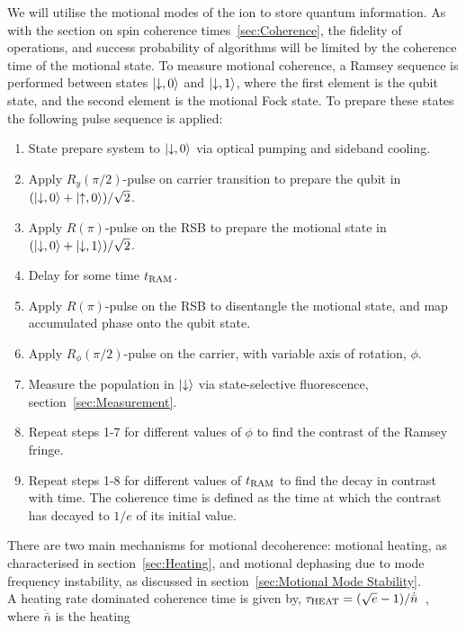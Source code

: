     We will utilise the motional modes of the ion to store quantum information.
    As with the section on spin coherence times~\ref{sec:Coherence}, the
    fidelity of operations, and success probability of algorithms will be
    limited by the coherence time of the motional state.  To measure motional
    coherence, a Ramsey sequence is performed between states $\ket{\downarrow, 0}$
    and $\ket{\downarrow, 1}$, where the first element is the qubit
    state, and the second element is the motional Fock state. To prepare these
    states the following pulse sequence is applied:
    \begin{enumerate}
    \item State prepare system to $\ket{\downarrow, 0}$ via optical pumping and sideband cooling.
    \item Apply $R_y(\pi/2)$-pulse on carrier transition to prepare the qubit in $(\ket{\downarrow, 0} + \ket{\uparrow, 0})/\sqrt{2}$.
    \item Apply $R(\pi)$-pulse on the RSB to prepare the motional state in $(\ket{\downarrow, 0} + \ket{\downarrow, 1})/\sqrt{2}$.
    \item Delay for some time $t_{\rm RAM}$.
    \item Apply $R(\pi)$-pulse on the RSB to disentangle the motional state, and map accumulated phase onto the qubit state.
    \item Apply $R_\phi(\pi/2)$-pulse on the carrier, with variable axis of rotation, $\phi$.
    \item Measure the population in $\ket{\downarrow}$ via state-selective fluorescence, section~\ref{sec:Measurement}.
    \item Repeat steps 1-7 for different values of $\phi$ to find the contrast of the Ramsey fringe.
    \item Repeat steps 1-8 for different values of $t_{\rm RAM}$ to find the decay in contrast with time. The coherence time is defined as the time at which the contrast has decayed to $1/e$ of its initial value.
    \end{enumerate}
    There are two main mechanisms for motional decoherence\cite{turchette2000decoherence}: motional heating, as
    characterised in section~\ref{sec:Heating}, and motional dephasing due to
    mode frequency instability, as discussed in section~\ref{sec:Motional Mode Stability}. \\
    A heating rate dominated coherence time is given by, $\tau_{\rm HEAT} =
    (\sqrt{e}-1)/\dot{\bar{n}}$~\cite{turchette2000decoherence}, where $\dot{\bar{n}}$ is the heating
